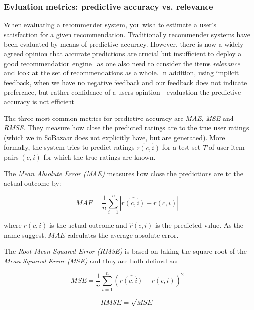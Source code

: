 \subsubsection{Evluation metrics: predictive accuracy vs. relevance}
When evaluating a recommender system, you wish to estimate a user's
satisfaction for a given recommendation. Traditionally recommender systems have
been evaluated by means of predictive accuracy. However, there is now a widely
agreed opinion that accurate predictions are crucial but insufficient to deploy a good
recommendation engine~\cite{Shani2011, McNee2006} as one also need to consider
the items \textit{relevance} and look at the set of recommendations as a whole.
In addition, using implicit feedback, when we have no negative feedback and our
feedback does not indicate preference, but rather confidence of a users
opintion - evaluation the predictive accuracy is not efficient~\cite{something}

The three most common metrics for predictive accuracy are \textit{MAE},
\textit{MSE} and \textit{RMSE}. They measure how close the predicted ratings
are to the true user ratings (which we in SoBazaar does not explicitly have,
but are generated). More formally, the system tries to predict ratings
$\hat{r(c,i)}$ for a test set $T$ of user-item pairs $(c, i)$ for which the
true ratings are known.

The \textit{Mean Absolute Error (MAE)} measures how close the predictions are
to the actual outcome by:

\begin{equation}
    MAE = \frac{1}{n}\sum_{i=1}^{n}{|\hat{r(c,i)}-r(c,i)|}
    \label{equation:mae}
\end{equation}

where $r(c,i)$ is the actual outcome and $\hat{r}(c,i)$ is the predicted
value. As the name suggest, $MAE$ calculates the average absolute error.

The \textit{Root Mean Squared Error (RMSE)} is based on taking the square root
of the \textit{Mean Squared Error (MSE)} and they are both defined as:

\begin{equation}
    MSE = \frac{1}{n}\sum_{i=1}^{n}{(\hat{r(c,i)} - r(c,i))^{2}}
    \label{equation:mse}
\end{equation}

\begin{equation}
    RMSE = \sqrt{MSE}
    \label{equation:rmse}
\end{equation}


